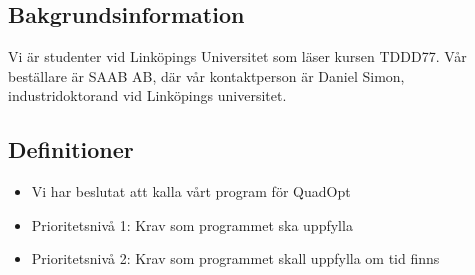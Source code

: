\subsection{Bakgrundsinformation}
Vi är studenter vid Linköpings Universitet som läser kursen TDDD77. Vår beställare är SAAB AB, där vår kontaktperson är Daniel Simon, industridoktorand vid Linköpings universitet. 

\subsection{Definitioner}

\begin{itemize}
\item{Vi har beslutat att kalla vårt program för QuadOpt}
\item{Prioritetsnivå 1: Krav som programmet ska uppfylla}
\item{Prioritetsnivå 2: Krav som programmet skall uppfylla om tid finns}
\end{itemize}
